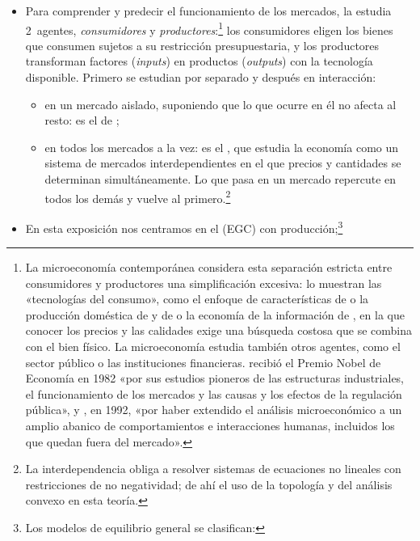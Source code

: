 \documentclass[11pt]{article}
\begin{document}
\begin{itemize}
\begin{itemize}
\begin{itemize}
    \end{itemize}
  \item Para comprender y predecir el funcionamiento de los mercados, la  estudia 2~agentes, \emph{consumidores} y \emph{productores}:\footnote{La microeconomía contemporánea considera esta separación estricta entre consumidores y productores una simplificación excesiva\nocite{EkelundHebert2013History}: lo muestran las «tecnologías del consumo», como el enfoque de características de \textcite{Lancaster1966New} o la producción doméstica de \textcite{Becker1965Allocation} y de \textcite{Gronau1977Leisure} o la economía de la información de \textcite{Stigler1961Information}, en la que conocer los precios y las calidades exige una búsqueda costosa que se combina con el bien físico. La microeconomía estudia también otros agentes, como el sector público o las instituciones financieras.  recibió el Premio Nobel de Economía en 1982 «por sus estudios pioneros de las estructuras industriales, el funcionamiento de los mercados y las causas y los efectos de la regulación pública»\nocite{Nobel1982Stigler}, y , en 1992, «por haber extendido el análisis microeconómico a un amplio abanico de comportamientos e interacciones humanas, incluidos los que quedan fuera del mercado»\nocite{Nobel1992Becker}.} los consumidores eligen los bienes que consumen sujetos a su restricción presupuestaria, y los productores transforman factores (\emph{inputs}) en productos (\emph{outputs}) con la tecnología disponible. Primero se estudian por separado y después en interacción:
    \begin{itemize}
    \item en un mercado aislado, suponiendo que lo que ocurre en él no afecta al resto: es el  de  ;
    \item en todos los mercados a la vez: es el , que estudia la economía como un sistema de mercados interdependientes en el que precios y cantidades se determinan simultáneamente. Lo que pasa en un mercado repercute en todos los demás y vuelve al primero.\footnote{La interdependencia obliga a resolver sistemas de ecuaciones no lineales con restricciones de no negatividad; de ahí el uso de la topología y del análisis convexo en esta teoría.}
    \end{itemize}
  \item En esta exposición nos centramos en el  (EGC) con producción;\footnote{Los modelos de equilibrio general se clasifican:
}
\end{itemize}
\end{itemize}
\end{document}
